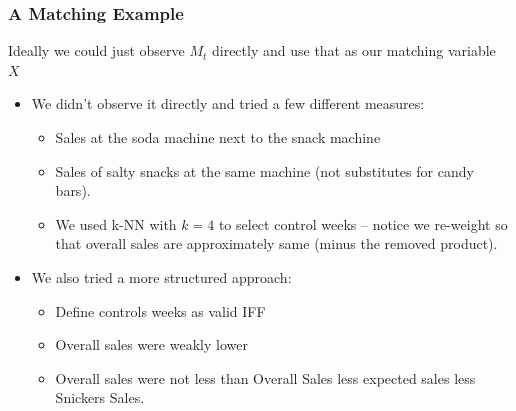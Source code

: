 \documentclass[xcolor=pdftex,dvipsnames,table,mathserif]{beamer}
\begin{document}
\begin{frame}
\frametitle{A Matching Example}
Ideally we could just observe $M_t$ directly and use that as our matching variable $X$
\begin{itemize}
\item We didn't observe it directly and tried a few different measures:
\begin{itemize}
\item Sales at the soda machine next to the snack machine
\item Sales of salty snacks at the same machine (not substitutes for candy bars).
\item We used k-NN with $k=4$ to select control weeks -- notice we re-weight so that overall sales are approximately same (minus the removed product).
\end{itemize}
\item We also tried a more structured approach:
\begin{itemize}
\item Define controls weeks as valid IFF
\item Overall sales were weakly lower
\item Overall sales were not less than Overall Sales less expected sales less Snickers Sales.
\end{itemize}
\end{itemize}
\end{frame}
\end{document}
